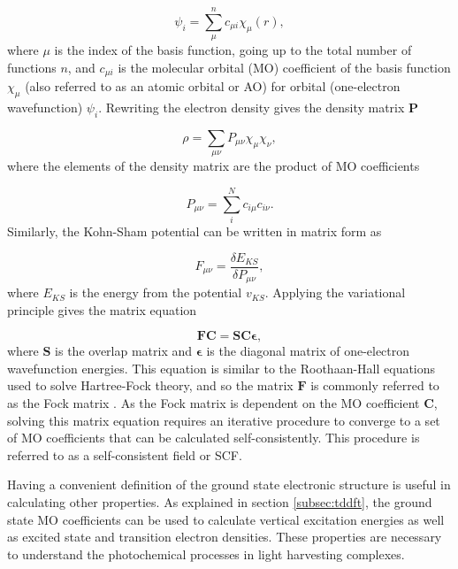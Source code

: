 \begin{equation}
    \psi_i = \sum_\mu^n c_{\mu i} \chi_\mu \left( r\right),
\end{equation}
%
where $\mu$ is the index of the basis function, going up to the total number of functions
$n$, and $c_{\mu i}$ is the molecular orbital (MO) coefficient of the basis function
$\chi_\mu$ (also referred to as an atomic orbital or AO) for orbital (one-electron 
wavefunction) $\psi_i$. Rewriting the electron density gives the density matrix 
$\mathbf{P}$

\begin{equation}
    \rho = \sum_{\mu\nu} P_{\mu\nu} \chi_\mu \chi_\nu,
\end{equation}
%
where the elements of the density matrix are the product of MO coefficients

\begin{equation}
    P_{\mu\nu} = \sum_i^N c_{i \mu} c_{i \nu}.
\end{equation}
%
Similarly, the Kohn-Sham potential can be written in matrix form as

\begin{equation}
    F_{\mu \nu} = \frac{\delta E_{KS}}{\delta P_{\mu\nu}},
\end{equation}
%
where $E_{KS}$ is the energy from the potential $v_{KS}$. Applying the variational
principle gives the matrix equation

\begin{equation}
    \mathbf{F} \mathbf{C} = \mathbf{S} \mathbf{C} \mathbf{\epsilon},
\end{equation}
%
where $\mathbf{S}$ is the overlap matrix and $\mathbf{\epsilon}$ is the diagonal 
matrix of one-electron wavefunction energies. This equation is similar to the
Roothaan-Hall equations used to solve Hartree-Fock theory, and so the matrix $\mathbf{F}$
is commonly referred to as the Fock matrix \cite{Roothaan1951}. As the Fock matrix
is dependent on the MO coefficient $\mathbf{C}$, solving this matrix equation requires
an iterative procedure to converge to a set of MO coefficients that can be calculated
self-consistently. This procedure is referred to as a self-consistent field or SCF.

Having a convenient definition of the ground state electronic structure is useful
in calculating other properties. As explained in section \ref{subsec:tddft}, the
ground state MO coefficients can be used to calculate vertical excitation energies
as well as excited state and transition electron densities. These properties are
necessary to understand the photochemical processes in light harvesting complexes.

